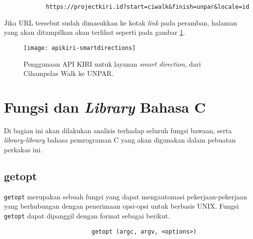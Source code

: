 \begin{verbatim}
            https://projectkiri.id?start=ciwalk&finish=unpar&locale=id
\end{verbatim}
\noindent
Jika URL tersebut sudah dimasukkan ke kotak \textit{link} pada peramban, halaman yang akan ditampilkan akan terlihat seperti pada gambar \ref{fig:kiri-api-smartdirections-usage}.

\begin{figure}[ht]
    \centering
    \texttt{[image: apikiri-smartdirections]}
    \caption[Penggunaan API KIRI untuk layanan \textit{smart direction}]{Penggunaan API KIRI untuk layanan \textit{smart direction}, dari Cihampelas Walk ke UNPAR.}
    \label{fig:kiri-api-smartdirections-usage}
\end{figure}

\section{Fungsi dan \textit{Library} Bahasa C}
\label{sec:cmodules}

Di bagian ini akan dilakukan analisis terhadap seluruh fungsi bawaan, serta \textit{library-library} bahasa pemrograman C yang akan digunakan dalam pebuatan perkakas ini.

\subsection{getopt \cite{gnulibrary:2022:getopt}}
\label{sec:cmodules-getopt}

\verb|getopt| merupakan sebuah fungsi yang dapat mengautomasi pekerjaan-pekerjaan yang berhubungan dengan penerimaan opsi-opsi untuk \cl berbasis UNIX.
\newline\newline\noindent
Fungsi \verb|getopt| dapat dipanggil dengan format sebagai berikut.

\begin{verbatim}
                         getopt (argc, argv, <options>)
\end{verbatim}

